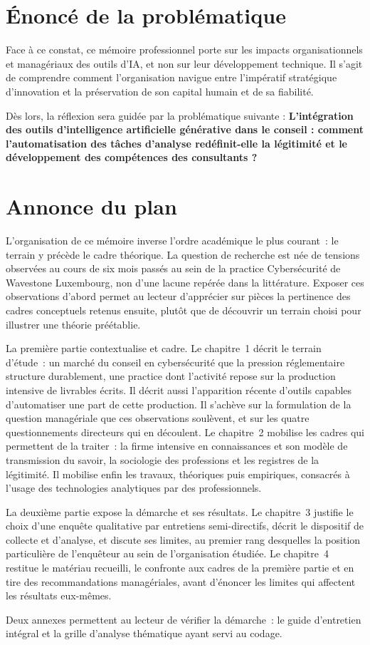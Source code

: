 \section{Énoncé de la problématique}
Face à ce constat, ce mémoire professionnel porte sur les impacts organisationnels et managériaux des outils d'IA, et non sur leur développement technique. Il s'agit de comprendre comment l'organisation navigue entre l'impératif stratégique d'innovation et la préservation de son capital humain et de sa fiabilité. 

Dès lors, la réflexion sera guidée par la problématique suivante : \textbf{L'intégration des outils d'intelligence artificielle générative dans le conseil : comment l'automatisation des tâches d'analyse redéfinit-elle la légitimité et le développement des compétences des consultants ?}

\section{Annonce du plan}
 
L'organisation de ce mémoire inverse l'ordre académique le plus courant~: le terrain y
précède le cadre théorique. La question de recherche est née de tensions observées au cours de six mois passés au sein de la practice Cybersécurité de Wavestone Luxembourg, non d'une lacune repérée dans la littérature. Exposer ces
observations d'abord permet au lecteur d'apprécier sur pièces la pertinence des cadres
conceptuels retenus ensuite, plutôt que de découvrir un terrain choisi pour illustrer une
théorie préétablie.
 
La première partie contextualise et cadre. Le chapitre~1 décrit le terrain d'étude~: un
marché du conseil en cybersécurité que la pression réglementaire structure durablement, une
practice dont l'activité repose sur la production intensive de livrables écrits. Il décrit
aussi l'apparition récente d'outils capables d'automatiser une part de cette production. Il
s'achève sur la formulation de la question managériale que ces observations soulèvent, et sur les quatre questionnements directeurs qui en découlent. Le
chapitre~2 mobilise les cadres qui permettent de la traiter~: la firme intensive en
connaissances et son modèle de transmission du savoir, la sociologie des professions et les
registres de la légitimité. Il mobilise enfin les travaux, théoriques puis empiriques,
consacrés à l'usage des technologies analytiques par des professionnels.
 
La deuxième partie expose la démarche et ses résultats. Le chapitre~3 justifie le choix
d'une enquête qualitative par entretiens semi-directifs, décrit le dispositif de collecte
et d'analyse, et discute ses limites, au premier rang desquelles la position particulière
de l'enquêteur au sein de l'organisation étudiée. Le chapitre~4 restitue le matériau
recueilli, le confronte aux cadres de la première partie et en tire des recommandations managériales, avant d'énoncer les limites qui affectent les résultats eux-mêmes.
 
Deux annexes permettent au lecteur de vérifier la démarche~: le guide d'entretien
intégral et la grille d'analyse thématique ayant servi au codage.